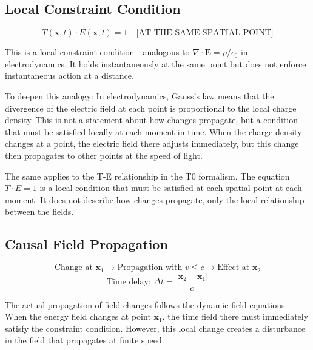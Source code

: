 \documentclass[12pt,a4paper]{article}
\begin{document}
	\subsection{Local Constraint Condition}
	
	\begin{equation}
		T(\mathbf{x},t) \cdot E(\mathbf{x},t) = 1 \quad \text{[AT THE SAME SPATIAL POINT]} \label{eq:local_constraint}
	\end{equation}
	
	This is a local constraint condition—analogous to $\nabla \cdot \mathbf{E} = \rho/\epsilon_0$ in electrodynamics. It holds instantaneously at the same point but does not enforce instantaneous action at a distance.
	
	To deepen this analogy: In electrodynamics, Gauss's law means that the divergence of the electric field at each point is proportional to the local charge density. This is not a statement about how changes propagate, but a condition that must be satisfied locally at each moment in time. When the charge density changes at a point, the electric field there adjusts immediately, but this change then propagates to other points at the speed of light.
	
	The same applies to the T-E relationship in the T0 formalism. The equation $T \cdot E = 1$ is a local condition that must be satisfied at each spatial point at each moment. It does not describe how changes propagate, only the local relationship between the fields.
	
	\subsection{Causal Field Propagation}
	
	\begin{equation}
		\text{Change at } \mathbf{x}_1 \rightarrow \text{Propagation with } v \leq c \rightarrow \text{Effect at } \mathbf{x}_2
	\end{equation}
	\begin{equation}
		\text{Time delay: } \Delta t = \frac{|\mathbf{x}_2 - \mathbf{x}_1|}{c} \label{eq:time_delay}
	\end{equation}
	
	The actual propagation of field changes follows the dynamic field equations. When the energy field changes at point $\mathbf{x}_1$, the time field there must immediately satisfy the constraint condition. However, this local change creates a disturbance in the field that propagates at finite speed.
	
\end{document}

